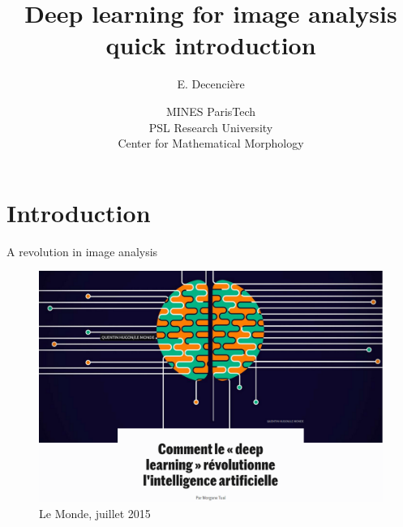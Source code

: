 \documentclass[xcolor=pdftex,dvipsnames,table,mathserif]{beamer}
\title{Deep learning for image analysis quick introduction}
\author{E. Decencière}
\date{MINES ParisTech\\
  PSL Research University\\
  Center for Mathematical Morphology
}
\begin{document}
\frame{\titlepage}


\section{Introduction}

\begin{frame}{A revolution in image analysis}

\begin{figure}[ht]
  \centering
  \includegraphics[height=0.5\textheight]{lemonde-juillet2015}
  \caption{Le Monde, juillet 2015}
\end{figure}


\end{frame}
\end{document}
